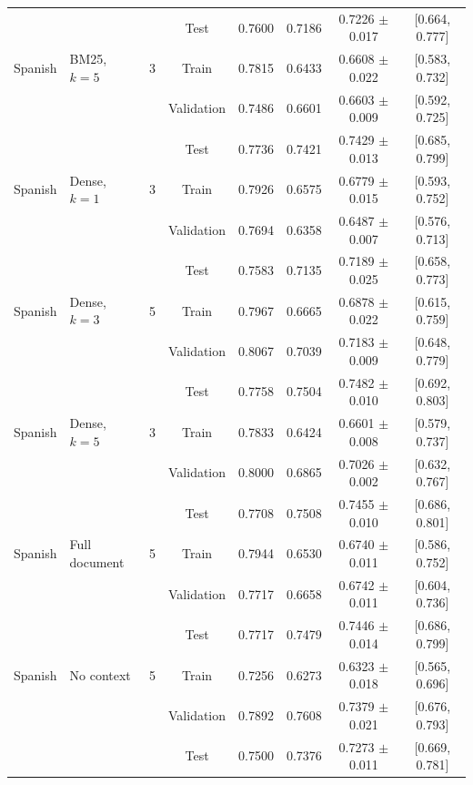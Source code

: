 \begin{tabular}{llcccccc}
 & &  & Test & 0.7600 & 0.7186 & 0.7226 $\pm$ 0.017 & [0.664, 0.777] \\
Spanish & BM25, $k=5$ & 3 & Train & 0.7815 & 0.6433 & 0.6608 $\pm$ 0.022 & [0.583, 0.732] \\
 & &  & Validation & 0.7486 & 0.6601 & 0.6603 $\pm$ 0.009 & [0.592, 0.725] \\
 & &  & Test & 0.7736 & 0.7421 & 0.7429 $\pm$ 0.013 & [0.685, 0.799] \\
Spanish & Dense, $k=1$ & 3 & Train & 0.7926 & 0.6575 & 0.6779 $\pm$ 0.015 & [0.593, 0.752] \\
 & &  & Validation & 0.7694 & 0.6358 & 0.6487 $\pm$ 0.007 & [0.576, 0.713] \\
 & &  & Test & 0.7583 & 0.7135 & 0.7189 $\pm$ 0.025 & [0.658, 0.773] \\
Spanish & Dense, $k=3$ & 5 & Train & 0.7967 & 0.6665 & 0.6878 $\pm$ 0.022 & [0.615, 0.759] \\
 & &  & Validation & 0.8067 & 0.7039 & 0.7183 $\pm$ 0.009 & [0.648, 0.779] \\
 & &  & Test & 0.7758 & 0.7504 & 0.7482 $\pm$ 0.010 & [0.692, 0.803] \\
Spanish & Dense, $k=5$ & 3 & Train & 0.7833 & 0.6424 & 0.6601 $\pm$ 0.008 & [0.579, 0.737] \\
 & &  & Validation & 0.8000 & 0.6865 & 0.7026 $\pm$ 0.002 & [0.632, 0.767] \\
 & &  & Test & 0.7708 & 0.7508 & 0.7455 $\pm$ 0.010 & [0.686, 0.801] \\
Spanish & Full document & 5 & Train & 0.7944 & 0.6530 & 0.6740 $\pm$ 0.011 & [0.586, 0.752] \\
 & &  & Validation & 0.7717 & 0.6658 & 0.6742 $\pm$ 0.011 & [0.604, 0.736] \\
 & &  & Test & 0.7717 & 0.7479 & 0.7446 $\pm$ 0.014 & [0.686, 0.799] \\
Spanish & No context & 5 & Train & 0.7256 & 0.6273 & 0.6323 $\pm$ 0.018 & [0.565, 0.696] \\
 & &  & Validation & 0.7892 & 0.7608 & 0.7379 $\pm$ 0.021 & [0.676, 0.793] \\
 & &  & Test & 0.7500 & 0.7376 & 0.7273 $\pm$ 0.011 & [0.669, 0.781] \\
\hline
\end{tabular}
